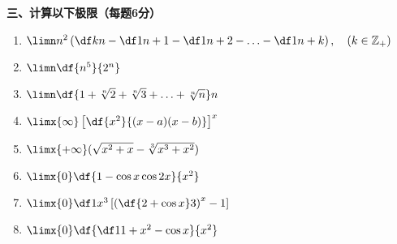 {\bf 三、计算以下极限（每题6分）}
\begin{enumerate}[(1)]
  \setlength{\itemindent}{1cm}
  \item $\limn n^2\left(\df
  kn-\df1{n+1}-\df1{n+2}-\ldots-\df1{n+k}\right),\quad(k\in\mathbb{Z}_+)$
  \item $\limn\df{n^5}{2^n}$
  \item $\limn\df{1+\sqrt[n]2+\sqrt[n]3+\ldots+\sqrt[n]n}n$
  \item $\limx{\infty}\left[\df{x^2}{(x-a)(x-b)}\right]^x$
  \item $\limx{+\infty}(\sqrt{x^2+x}-\sqrt[3]{x^3+x^2})$ 
  \item $\limx{0}\df{1-\cos x\cos 2x}{x^2}$
  \item $\limx{0}\df1{x^3}\left[\left(\df{2+\cos x}3\right)^x-1\right]$
  \item $\limx{0}\df{\df1{1+x^2}-\cos x}{x^2}$
\end{enumerate}


